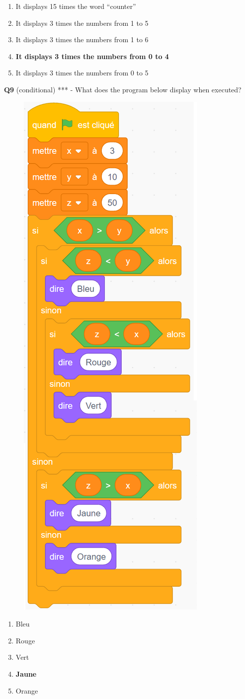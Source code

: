 \documentclass[14pt]{extarticle}
\begin{document}
\begin{enumerate}[label=\alph*)]
    \item It displays 15 times the word “counter”
    \item It displays 3 times the numbers from 1 to 5
    \item It displays 3 times the numbers from 1 to 6
    \item \textbf{It displays 3 times the numbers from 0 to 4}
    \item It displays 3 times the numbers from 0 to 5
\end{enumerate}
\newpage
\textbf{Q9} (conditional) *** -
What does the program below display when executed?
\begin{figure}[H]
    \centering
    \includegraphics[width=0.4\linewidth]{images/pretest/_Q9.png}
\end{figure}

\begin{enumerate}[label=\alph*)]
    \item Bleu
    \item Rouge
    \item Vert
    \item \textbf{Jaune}
    \item Orange
\end{enumerate}
\newpage
\end{document}
